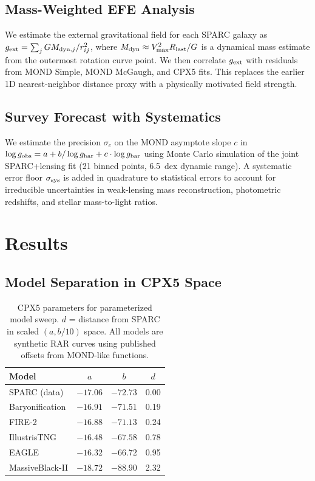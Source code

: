 \documentclass[twocolumn]{aastex631}
\begin{document}
\subsection{Mass-Weighted EFE Analysis}

We estimate the external gravitational field for each SPARC galaxy as
$g_{\rm ext} = \sum_j G M_{{\rm dyn},j} / r_{ij}^2$, where $M_{\rm dyn}
\approx V_{\rm max}^2 R_{\rm last} / G$ is a dynamical mass estimate
from the outermost rotation curve point.  We then correlate $g_{\rm
ext}$ with residuals from MOND Simple, MOND McGaugh, and CPX5 fits.
This replaces the earlier 1D nearest-neighbor distance proxy with a
physically motivated field strength.

\subsection{Survey Forecast with Systematics}

We estimate the precision $\sigma_c$ on the MOND asymptote slope $c$ in
$\log g_{\rm obs} = a + b/\log g_{\rm bar} + c\cdot\log g_{\rm bar}$
using Monte Carlo simulation of the joint SPARC+lensing fit (21 binned
points, 6.5~dex dynamic range).  A systematic error floor $\sigma_{\rm
sys}$ is added in quadrature to statistical errors to account for
irreducible uncertainties in weak-lensing mass reconstruction, photometric
redshifts, and stellar mass-to-light ratios.

\section{Results}

\subsection{Model Separation in CPX5 Space}

\begin{table}
\centering
\caption{CPX5 parameters for parameterized model sweep.  $d$ = distance
from SPARC in scaled $(a,b/10)$ space.  All models are synthetic RAR
curves using published offsets from MOND-like functions.}
\begin{tabular}{lccc}
\hline
Model & $a$ & $b$ & $d$ \\
\hline
SPARC (data)       & $-17.06$ & $-72.73$ & 0.00 \\
Baryonification    & $-16.91$ & $-71.51$ & 0.19 \\
FIRE-2             & $-16.88$ & $-71.13$ & 0.24 \\
IllustrisTNG       & $-16.48$ & $-67.58$ & 0.78 \\
EAGLE              & $-16.32$ & $-66.72$ & 0.95 \\
MassiveBlack-II    & $-18.72$ & $-88.90$ & 2.32 \\
\hline
\end{tabular}
\label{tab:sims}
\end{table}
\end{document}
